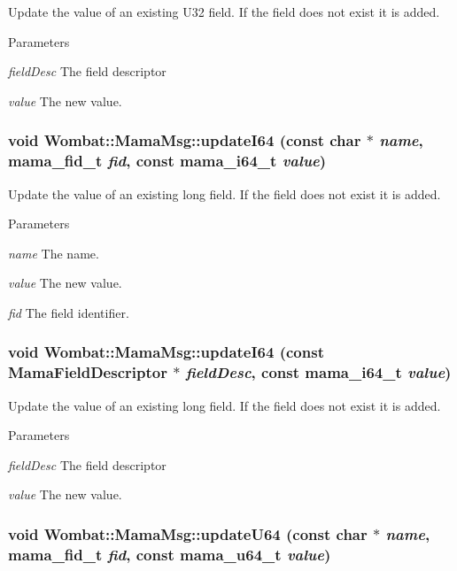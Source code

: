 Update the value of an existing U32 field. If the field does not exist it is added.


\begin{DoxyParams}{Parameters}
\item[{\em fieldDesc}]The field descriptor \item[{\em value}]The new value. \end{DoxyParams}
\hypertarget{classWombat_1_1MamaMsg_a42dacab96197c1d240f8a043972b4a24}{
\subsubsection[{updateI64}]{\setlength{\rightskip}{0pt plus 5cm}void Wombat::MamaMsg::updateI64 (const char $\ast$ {\em name}, \/  mama\_\-fid\_\-t {\em fid}, \/  const mama\_\-i64\_\-t {\em value})}}
\label{classWombat_1_1MamaMsg_a42dacab96197c1d240f8a043972b4a24}


Update the value of an existing long field. If the field does not exist it is added.


\begin{DoxyParams}{Parameters}
\item[{\em name}]The name. \item[{\em value}]The new value. \item[{\em fid}]The field identifier. \end{DoxyParams}
\hypertarget{classWombat_1_1MamaMsg_a48620236cd07bcec1722e5ee268dd012}{
\subsubsection[{updateI64}]{\setlength{\rightskip}{0pt plus 5cm}void Wombat::MamaMsg::updateI64 (const {\bf MamaFieldDescriptor} $\ast$ {\em fieldDesc}, \/  const mama\_\-i64\_\-t {\em value})}}
\label{classWombat_1_1MamaMsg_a48620236cd07bcec1722e5ee268dd012}


Update the value of an existing long field. If the field does not exist it is added.


\begin{DoxyParams}{Parameters}
\item[{\em fieldDesc}]The field descriptor \item[{\em value}]The new value. \end{DoxyParams}
\hypertarget{classWombat_1_1MamaMsg_a037e5ebbe88af7be3ef09c92d4d3626f}{
\subsubsection[{updateU64}]{\setlength{\rightskip}{0pt plus 5cm}void Wombat::MamaMsg::updateU64 (const char $\ast$ {\em name}, \/  mama\_\-fid\_\-t {\em fid}, \/  const mama\_\-u64\_\-t {\em value})}}
\label{classWombat_1_1MamaMsg_a037e5ebbe88af7be3ef09c92d4d3626f}


